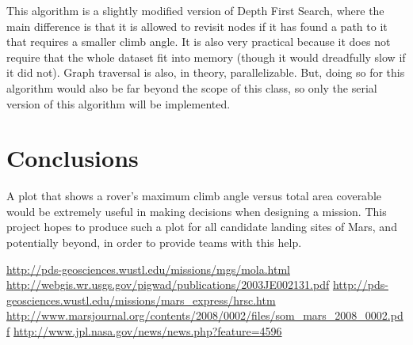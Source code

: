 \documentclass[12pt, twocolumn]{article}
\begin{document}
\par This algorithm is a slightly modified version of Depth First Search, where the main difference is that it is allowed to revisit nodes if it has found a path to it that requires a smaller climb angle. It is also very practical because it does not require that the whole dataset fit into memory (though it would dreadfully slow if it did not). Graph traversal is also, in theory, parallelizable. But, doing so for this algorithm would also be far beyond the scope of this class, so only the serial version of this algorithm will be implemented.

\section{Conclusions}
\label{sec:conclusions}
A plot that shows a rover's maximum climb angle versus total area coverable would be extremely useful in making decisions when designing a mission. This project hopes to produce such a plot for all candidate landing sites of Mars, and potentially beyond, in order to provide teams with this help.

\begin{thebibliography}{1}
\url{http://pds-geosciences.wustl.edu/missions/mgs/mola.html}
\url{http://webgis.wr.usgs.gov/pigwad/publications/2003JE002131.pdf}
\url{http://pds-geosciences.wustl.edu/missions/mars_express/hrsc.htm}
\url{http://www.marsjournal.org/contents/2008/0002/files/som_mars_2008_0002.pdf}
\url{http://www.jpl.nasa.gov/news/news.php?feature=4596}
\end{thebibliography}
\end{document}
